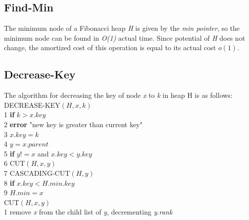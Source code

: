 \documentclass[12pt, a4paper]{article}
\begin{document}
	\subsection{Find-Min}
	The minimum node of a Fibonacci heap \textit{H} is given by the \textit{min  pointer}, so the minimum node can be found in \textit{O(1)} actual time. Since potential of \textit{H} does not change, the amortized cost  of this operation is equal to its actual cost $o(1)$.
	
	\subsection{Decrease-Key}   
	The algorithm for decreasing the key of node \textit{x} to \textit{k} in heap H is as follows: \\
	\newline
	\large{DECREASE-KEY$(H, x, k)$} \\
	1\-\hspace{0.5cm}	 \textbf{if} $k > x.key$ \\
	2\-\hspace{0.5cm} \-\hspace{0.5cm} \textbf{error} "new key is greater than current key"\\
	3\-\hspace{0.5cm} $x.key = k$ \\
	4\-\hspace{0.5cm} $y = x.parent$ \\
	5\-\hspace{0.5cm} \textbf{if} $y != x$ and $x.key < y.key$ \\
	6\-\hspace{0.5cm} \-\hspace{0.5cm} \large{CUT$(H, x, y)$} \\
	7\-\hspace{0.5cm} \-\hspace{0.5cm} \large{CASCADING-CUT$(H, y)$} \\
	8\-\hspace{0.5cm} \textbf{if} $x.key < H.min.key$ \\
	9\-\hspace{0.5cm} \-\hspace{0.5cm} $H.min = x$ \\
	\newline
	\large{CUT$(H, x, y)$} \\     
	1\-\hspace{0.5cm} remove \textit{x} from the child list of \textit{y}, decrementing \textit{y.rank} \\
\end{document}
